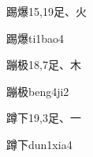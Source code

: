 \begin{entry}{踢爆}{15,19}{⾜、⽕}
  \begin{phonetics}{踢爆}{ti1bao4}
  \end{phonetics}
\end{entry}

\begin{entry}{蹦极}{18,7}{⾜、⽊}
  \begin{phonetics}{蹦极}{beng4ji2}
  \end{phonetics}
\end{entry}

\begin{entry}{蹲下}{19,3}{⾜、⼀}
  \begin{phonetics}{蹲下}{dun1xia4}
  \end{phonetics}
\end{entry}


